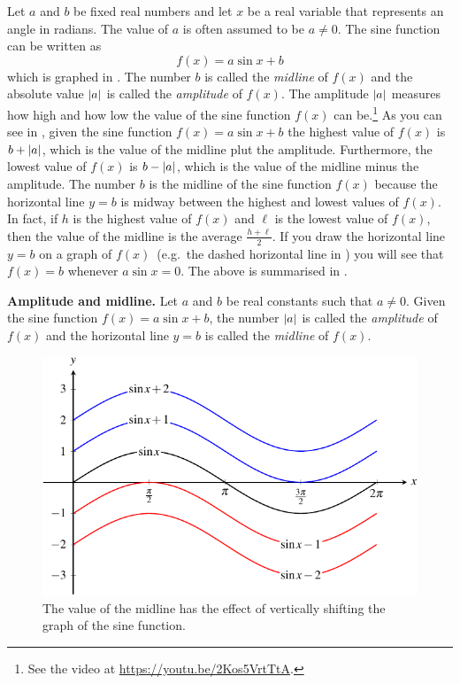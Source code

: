 \documentclass[a4paper,oneside,12pt]{article}
\begin{document}
Let $a$ and $b$ be fixed real numbers and let $x$ be a real variable
that represents an angle in radians.  The value of $a$ is often
assumed to be $a \neq 0$.  The sine function can be written
as
\[
f(x)
=
a \sin x + b
\]
which is graphed in .  The
number $b$ is called the \emph{midline} of $f(x)$ and the absolute
value $\lvert a\rvert$ is called the \emph{amplitude} of $f(x)$.
The amplitude $\lvert a\rvert$ measures how high and how low the
value of the sine function $f(x)$ can be.\footnote{
  See the video at
  \url{https://youtu.be/2Kos5VrtTtA}.
}
As you can see in , given the
sine function $f(x) = a \sin x + b$ the highest value of $f(x)$ is
$b + \lvert a\rvert$, which is the value of the midline plut the
amplitude.  Furthermore, the lowest value of $f(x)$ is
$b - \lvert a\rvert$, which is the value of the midline minus the
amplitude.  The number $b$ is the midline of the sine function $f(x)$
because the horizontal line $y = b$ is midway between the highest and
lowest values of $f(x)$.  In fact, if $h$ is the highest value of
$f(x)$ and $\ell$ is the lowest value of $f(x)$, then the value of the
midline is the average $\frac{h + \ell}{2}$.  If you draw the
horizontal line $y = b$ on a graph of $f(x)$~(e.g.~the dashed
horizontal line in ) you will
see that $f(x) = b$ whenever $a \sin x = 0$.  The above is summarised
in .

\begin{definition}
\label{def:trigonometric:sine_amplitude_and_midline}
\textbf{Amplitude and midline.}
Let $a$ and $b$ be real constants such that $a \neq 0$.  Given the
sine function $f(x) = a \sin x + b$, the number $\lvert a\rvert$ is
called the \emph{amplitude} of $f(x)$ and the horizontal line $y = b$
is called the \emph{midline} of $f(x)$.
\end{definition}

\begin{figure}[!htbp]
\centering
\includegraphics[scale=1.1]{image/13/sin-vertical-shift.pdf}
\caption{%
  The value of the midline has the effect of vertically shifting the
  graph of the sine function.
}
\label{fig:trigonometric:sine_vertical_shift}
\end{figure}
\end{document}
